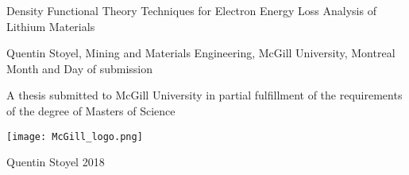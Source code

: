 \begin{titlepage}
    \begin{center}
        \vspace*{1cm}
        \huge
        {Density Functional Theory Techniques for Electron Energy Loss Analysis of Lithium Materials}
        
       
        
        
        
        \vspace{1.5cm}
        
        \large
        {Quentin Stoyel, Mining and Materials Engineering, McGill University, Montreal}\\
        
        {Month and Day of submission}
        
        
       \normalsize
       A thesis submitted to McGill University in partial fulfillment of the requirements of the degree of Masters of Science
        
		\vfill
        
		\texttt{[image: McGill\_logo.png]}
        
        {\textcopyright Quentin Stoyel 2018}
    \end{center}

\end{titlepage}

